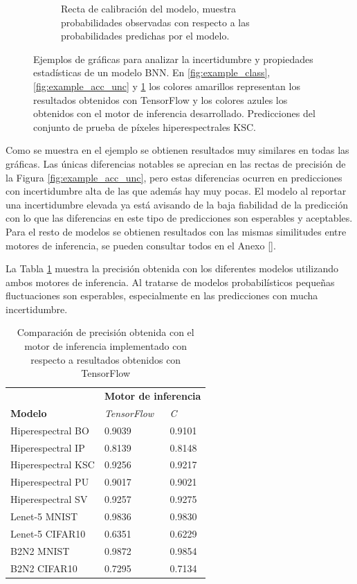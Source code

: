 \begin{figure}[h]
\begin{subfigure}[b]{0.48\textwidth}
     	\caption{Recta de calibración del modelo, muestra probabilidades observadas con respecto a las probabilidades predichas por el modelo.}
     	\label{fig:example_calibration}
 	\end{subfigure}
    	\caption{Ejemplos de gráficas para analizar la incertidumbre y propiedades estadísticas de un modelo BNN. En \ref{fig:example_class}, \ref{fig:example_acc_unc} y \ref{fig:example_calibration} los colores amarillos representan los resultados obtenidos con TensorFlow y los colores azules los obtenidos con el motor de inferencia desarrollado. Predicciones del conjunto de prueba de píxeles hiperespectrales KSC.}
    	\label{fig:figure_example}
\end{figure}

Como se muestra en el ejemplo se obtienen resultados muy similares en todas las gráficas. Las únicas diferencias notables se aprecian en las rectas de precisión de la Figura \ref{fig:example_acc_unc}, pero estas diferencias ocurren en predicciones con incertidumbre alta de las que además hay muy pocas. El modelo al reportar una incertidumbre elevada ya está avisando de la baja fiabilidad de la predicción con lo que las diferencias en este tipo de predicciones son esperables y aceptables. Para el resto de modelos se obtienen resultados con las mismas similitudes entre motores de inferencia, se pueden consultar todos en el Anexo \ref{}. \todo

La Tabla \ref{tab:engine_acc} muestra la precisión obtenida con los diferentes modelos utilizando ambos motores de inferencia. Al tratarse de modelos probabilísticos pequeñas fluctuaciones son esperables, especialmente en las predicciones con mucha incertidumbre.

\begin{table}[ht]
\centering
\caption{Comparación de precisión obtenida con el motor de inferencia implementado con respecto a resultados obtenidos con TensorFlow}
\label{tab:engine_acc}
\begin{tabular}{lll}
\hline
 &  \multicolumn{2}{c}{\textbf{Motor de inferencia}}\\
 \textbf{Modelo} & \textit{TensorFlow} & \textit{C} \\ \hline
 Hiperespectral BO   & 0.9039 & 0.9101 \\
 Hiperespectral IP   & 0.8139 & 0.8148 \\
 Hiperespectral KSC  & 0.9256 & 0.9217 \\
 Hiperespectral PU   & 0.9017 & 0.9021 \\
 Hiperespectral SV   & 0.9257 & 0.9275 \\
 Lenet-5 MNIST  	& 0.9836 & 0.9830 \\
 Lenet-5 CIFAR10	& 0.6351 & 0.6229 \\
 B2N2 MNIST     	& 0.9872 & 0.9854 \\
 B2N2 CIFAR10   	& 0.7295 & 0.7134 \\\hline
\end{tabular}
\end{table}

